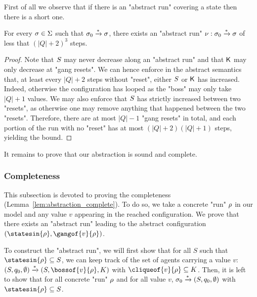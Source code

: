 First of all we observe that if there is an "abstract run" covering a state then there is a short one.

\begin{lemma}
	\label{lem:short-run}
	For every $\sigma \in \Sigma$ such that $\sigma_0 \xrightarrow{*} \sigma$, there exists an "abstract run" $\nu: \sigma_0 \xrightarrow{*} \sigma$ of less that $(|Q|+2)^3$ steps.
\end{lemma}

\ifproofs
\begin{proof}
	Note that $S$ may never decrease along an "abstract run" and that $\mathsf{K}$ may only decrease at "gang resets".
	We can hence enforce in the abstract semantics that, at least every $|Q|+2$ steps without "reset", either $S$ or $\mathsf{K}$ has increased. Indeed, otherwise the configuration has looped as the "boss" may only take $|Q| +1$ values. We may also enforce that $S$ has strictly increased between two "resets", as otherwise one may remove anything that happened between the two "resets". Therefore, there are at most $|Q|-1$ "gang resets" in total, and each portion of the run with no "reset" has at most $(|Q|+2)(|Q|+1)$ steps, yielding the bound. 
\end{proof}
\fi

It remains to prove that our abstraction is sound and complete. 


\subsubsection{Completeness}
\label{one-completeness}

This subsection is devoted to proving the completeness (Lemma~\ref{lem:abstraction_complete}). To do so, we take a concrete "run" $\rho$ in our model and any value $v$ appearing in the reached configuration. We prove that there exists an "abstract run" leading to the abstract configuration $(\statesin{\run}, \gangof{v}{\run})$. 

To construct the "abstract run", we will first show that for all $S$ such that $\statesin{\run} \subseteq S$, we can keep track of the set of agents carrying a value $v$: $(S, q_0, \emptyset) \step{\ast}(S, \bossof{\aval}{\run}, K)$ with $\cliqueof{\aval}{\run}\subseteq K$. 
Then, it is left to show that for all concrete "run" $\rho$ and for all value $v$, $\sigma_0 \xrightarrow{\ast} (S, q_0, \emptyset)$ with $\statesin{\run} \subseteq S$. 

